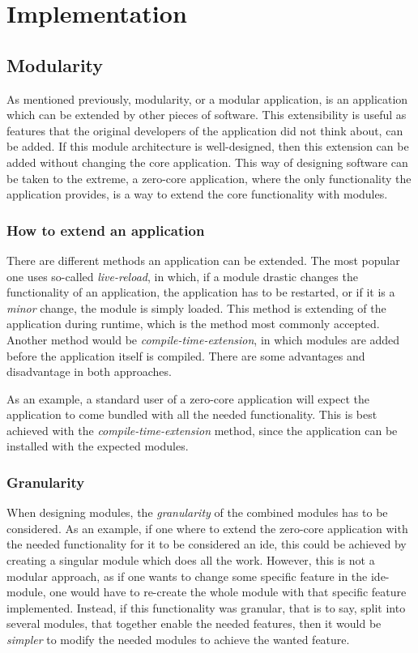 \chapter{Implementation}

\section{Modularity}

As mentioned previously, modularity, or a modular application, is an application
which can be extended by other pieces of software. This extensibility is useful
as features that the original developers of the application did not think about,
can be added. If this module architecture is well-designed, then this extension
can be added without changing the core application. This way of designing
software can be taken to the extreme, a zero-core application, where the only
functionality the application provides, is a way to extend the core functionality
with modules.


\subsection{How to extend an application}

There are different methods an application can be extended. The most popular one
 uses so-called \textit{live-reload}, in which, if a module
drastic changes the functionality of an application, the application has to be
restarted, or if it is a \textit{minor} change, the module is simply loaded.
This method is extending of the application during runtime, which is the method
most commonly accepted. Another method would be \textit{compile-time-extension},
in which modules are added before the application itself is compiled. There are
some advantages and disadvantage in both approaches.

As an example, a standard user of a zero-core application will expect the
application to come bundled with all the needed functionality. This is best
achieved with the \textit{compile-time-extension} method, since the application
can be installed with the expected modules.


\subsection{Granularity}

When designing modules, the \textit{granularity} of the combined modules has to
be considered. As an example, if one where to extend the zero-core application
with the needed functionality for it to be considered an \gls{ide}, this could be
achieved by creating a singular module which does all the work. However, this
is not a modular approach, as if one wants to change some specific feature in
the \gls{ide}-module, one would have to re-create the whole module with that
specific feature implemented. Instead, if this functionality was granular,
that is to say, split into several modules, that together enable the needed
features, then it would be \textit{simpler} to modify the needed modules to
achieve the wanted feature.


